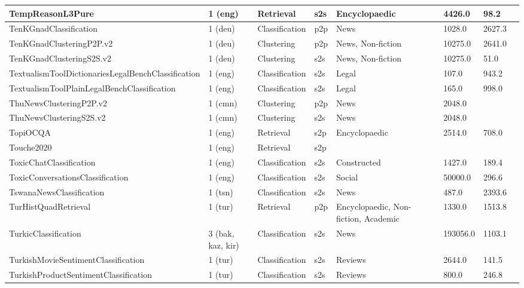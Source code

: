 \begin{longtable}{L{5.0cm}|L{1.5cm}L{1.4cm}L{1.4cm}L{1.4cm}L{1.4cm}L{1.0cm}L{1.0cm}}
 \hline 
TempReasonL3Pure \cite{xiao2024rar} & 1 (eng) & Retrieval & s2s & Encyclopaedic & 4426.0 & 98.2 \\
 \hline 
TenKGnadClassification \cite{Schabus2017} & 1 (deu) & Classification & p2p & News & 1028.0 & 2627.3 \\
 \hline 
TenKGnadClusteringP2P.v2  & 1 (deu) & Clustering & p2p & News, Non-fiction & 10275.0 & 2641.0 \\
 \hline 
TenKGnadClusteringS2S.v2  & 1 (deu) & Clustering & s2s & News, Non-fiction & 10275.0 & 51.0 \\
 \hline 
TextualismToolDictionariesLegalBenchClassification \cite{guha2023legalbench} & 1 (eng) & Classification & s2s & Legal & 107.0 & 943.2 \\
 \hline 
TextualismToolPlainLegalBenchClassification \cite{guha2023legalbench} & 1 (eng) & Classification & s2s & Legal & 165.0 & 998.0 \\
 \hline 
ThuNewsClusteringP2P.v2 \cite{THUCTC} & 1 (cmn) & Clustering & p2p & News & 2048.0 &  \\
 \hline 
ThuNewsClusteringS2S.v2 \cite{THUCTC} & 1 (cmn) & Clustering & s2s & News & 2048.0 &  \\
 \hline 
TopiOCQA \cite{adlakha2022topiocqa} & 1 (eng) & Retrieval & s2p & Encyclopaedic & 2514.0 & 708.0 \\
 \hline 
Touche2020 \cite{potthast_2022_6862281} & 1 (eng) & Retrieval & s2p &  &  &  \\
 \hline 
ToxicChatClassification \cite{lin2023toxicchat} & 1 (eng) & Classification & s2s & Constructed & 1427.0 & 189.4 \\
 \hline 
ToxicConversationsClassification \cite{jigsaw-unintended-bias-in-toxicity-classification} & 1 (eng) & Classification & s2s & Social & 50000.0 & 296.6 \\
 \hline 
TswanaNewsClassification \cite{marivate2023puoberta} & 1 (tsn) & Classification & s2s & News & 487.0 & 2393.6 \\
 \hline 
TurHistQuadRetrieval \cite{9559013} & 1 (tur) & Retrieval & p2p & Encyclopaedic, Non-fiction, Academic & 1330.0 & 1513.8 \\
 \hline 
TurkicClassification  & 3 (bak, kaz, kir) & Classification & s2s & News & 193056.0 & 1103.1 \\
 \hline 
TurkishMovieSentimentClassification \cite{Demirtas2013CrosslingualPD} & 1 (tur) & Classification & s2s & Reviews & 2644.0 & 141.5 \\
 \hline 
TurkishProductSentimentClassification \cite{Demirtas2013CrosslingualPD} & 1 (tur) & Classification & s2s & Reviews & 800.0 & 246.8 \\

\end{longtable}
